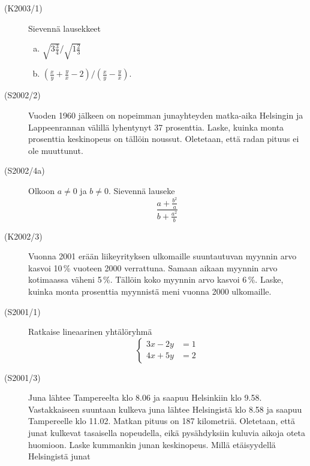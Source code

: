 \begin{description}
    \item[(K2003/1)]   Sievennä lausekkeet
        \begin{enumerate}[(a)]
            \item $ \sqrt{3\frac{3}{4}} \big/ \sqrt{1\frac{2}{3}} $
            \item $ \left( \frac{x}{y} + \frac{y}{x} -
                    2 \right) \big/ \left( \frac{x}{y} - \frac{y}{x} \right) $.
        \end{enumerate}
    \item[(S2002/2)]   Vuoden 1960 jälkeen on nopeimman junayhteyden matka-aika
                        Helsingin ja Lappeenrannan välillä lyhentynyt 37 prosenttia.
                        Laske, kuinka monta prosenttia keskinopeus on tällöin noussut.
                        Oletetaan, että radan pituus ei ole muuttunut.
    \item[(S2002/4a)]  Olkoon $ a \neq 0$ ja $b \neq 0 $. Sievennä lauseke
                        \[
                            \frac{a + \frac{b^2}{a} } {b + \frac{a^2}{b} }
                        \]
    \item[(K2002/3)]   Vuonna 2001 erään liikeyrityksen ulkomaille suuntautuvan
                        myynnin arvo kasvoi 10\,\% vuoteen 2000 verrattuna. Samaan
                        aikaan myynnin arvo kotimaassa väheni 5\,\%. Tällöin koko
                        myynnin arvo kasvoi 6\,\%. Laske, kuinka monta prosenttia
                        myynnistä meni vuonna 2000 ulkomaille.
    \item[(S2001/1)]   Ratkaise lineaarinen yhtälöryhmä
                       \[
                         \left\{
                          \begin{aligned}
                             3x - 2y &= 1 \\
                             4x + 5y &= 2                      
                         \end{aligned}
                         \right.
                       \]
    \item[(S2001/3)]   Juna lähtee Tampereelta klo 8.06 ja saapuu Helsinkiin klo 9.58.
                        Vastakkaiseen suuntaan kulkeva juna lähtee Helsingistä klo 8.58
                        ja saapuu Tampereelle klo 11.02. Matkan pituus on 187 kilometriä.
                        Oletetaan, että junat kulkevat tasaisella nopeudella, eikä
                        pysähdyksiin kuluvia aikoja oteta huomioon. Laske kummankin
                        junan keskinopeus. Millä etäisyydellä Helsingistä junat

\end{description}
